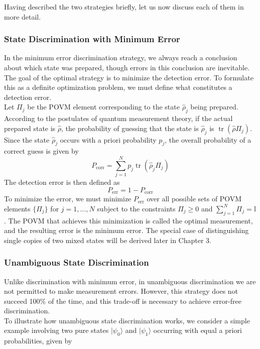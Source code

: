 Having described the two strategies briefly, let us now discuss each of them in more detail.

\subsubsection{State Discrimination with Minimum Error}
In the minimum error discrimination strategy, we always reach a conclusion about which state was prepared, though errors in this conclusion are inevitable. The goal of the optimal strategy is to minimize the detection error. To formulate this as a definite optimization problem, we must define what constitutes a detection error. \\

Let $\Pi_j$ be the POVM element corresponding to the state $\hat{\rho}_j$ being prepared. According to the postulates of quantum measurement theory, if the actual prepared state is $\hat{\rho}$, the probability of guessing that the state is $\hat{\rho}_j$ is $\operatorname{tr}(\hat{\rho} \Pi_j)$. Since the state $\hat{\rho}_j$ occurs with a priori probability $p_j$, the overall probability of a correct guess is given by 
\begin{equation}
    P_{\text{corr}} = \sum_{j=1}^N p_j \operatorname{tr}(\hat{\rho}_j \Pi_j)
\end{equation}
The detection error is then defined as 
\begin{equation}
    P_{\text{err}} = 1 - P_{\text{corr}}
\end{equation}
To minimize the error, we must minimize $P_{\text{err}}$ over all possible sets of POVM elements $\{\Pi_j\}$ for $j = 1, \ldots, N$ subject to the constraints $\Pi_j \geq 0$ and $\sum_{j=1}^N \Pi_j = \mathbb{I}$. The POVM that achieves this minimization is called the optimal measurement, and the resulting error is the minimum error. The special case of distinguishing single copies of two mixed states will be derived later in Chapter 3.

\subsubsection{Unambiguous State Discrimination}
Unlike discrimination with minimum error, in unambiguous discrimination we are not permitted to make measurement errors. However, this strategy does not succeed 100\% of the time, and this trade-off is necessary to achieve error-free discrimination.\\

To illustrate how unambiguous state discrimination works, we consider a simple example involving two pure states $|\psi_0\rangle$ and $|\psi_1\rangle$ occurring with equal a priori probabilities, given by

